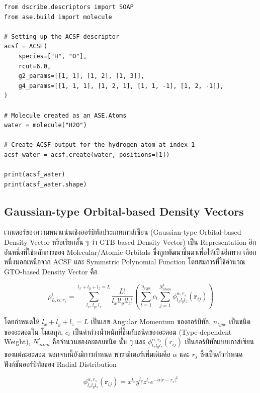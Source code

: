 \begin{lstlisting}[style=MyPython]
from dscribe.descriptors import SOAP
from ase.build import molecule

# Setting up the ACSF descriptor
acsf = ACSF(
    species=["H", "O"],
    rcut=6.0,
    g2_params=[[1, 1], [1, 2], [1, 3]],
    g4_params=[[1, 1, 1], [1, 2, 1], [1, 1, -1], [1, 2, -1]],
)

# Molecule created as an ASE.Atoms
water = molecule("H2O")

# Create ACSF output for the hydrogen atom at index 1
acsf_water = acsf.create(water, positions=[1])

print(acsf_water)
print(acsf_water.shape)
\end{lstlisting}

\subsection{Gaussian-type Orbital-based Density Vectors}
\label{ssec:gauss_orb_den}

เวกเตอร์ของความหนาแน่นเชิงออร์บิทัลประเภทเกาส์เซียน (Gaussian-type Orbital-based Density Vector หรือเรียกสั้น ๆ ว่า GTB-based 
Density Vector) เป็น Representation อีกอันหนึ่งที่ใช้หลักการของ Molecular/Atomic Orbitals ซึ่งถูกพัฒนาขึ้นมาเพื่อให้เป็นอีกทาง%
เลือกหนึ่งนอกเหนือจาก ACSF และ Symmstric Polynomial Function\autocite{kwac2021} โดยสมการที่ใช้คำนวณ GTO-based Density 
Vector คือ

\begin{equation}
    \rho^{i}_{L,\alpha,r_{s}} = \sum^{l_{x}+l_{y}+l_{z} = L}_{l_{x},l_{y},l_{z}} 
    \frac{L!}{l_{x}!l_{y}!l_{z}!} \left ( \sum^{n_{type}}_{t=1} c_{t} \sum^{N^{t}_{atom}}_{j=1} 
    \phi^{\alpha,r_{s}}_{l_{x}l_{y}l_{z}} (\bm{r}_{ij}) \right )
\end{equation}

\noindent โดยกำหนดให้ $l_{x}+l_{y}+l_{z} = L$ เป็นเลข Angular Momentum ของออร์บิทัล, $n_{type}$ เป็นชนิดของอะตอมใน%
โมเลกุล, $c_{t}$ เป็นค่าถ่วงน้ำหนักที่ขึ้นกับชนิดของอะตอม (Type-dependent Weight), $N^{t}_{atom}$ คือจำนวนของอะตอมชนิด%
นั้น ๆ และ $\phi^{\alpha,r_{s}}_{l_{x}l_{y}l_{z}} (r_{ij})$ เป็นออร์บิทัลแบบเกาส์เซียนของแต่ละอะตอม นอกจากนี้ยังมีการกำหนด%
พารามิเตอร์เพิ่มเติมคือ $\alpha$ และ $r_{s}$ ซึ่งเป็นตัวกำหนดฟังก์ชันออร์บิทัลของ Radial Distribution

\begin{equation}
    \phi^{\alpha,r_{s}}_{l_{x}l_{y}l_{z}} (\bm{r}_{ij}) = x^{l_{x}}y^{l_{y}}z^{l_{z}} e^{-\alpha 
    |r-r_{s}|^{2}}
\end{equation}

